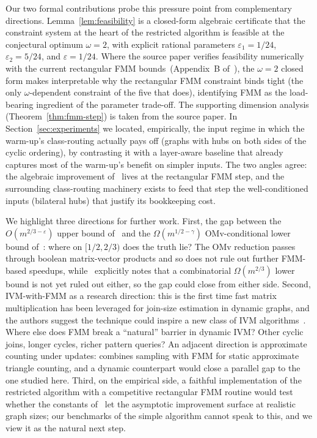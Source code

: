 \documentclass[sigconf,nonacm]{acmart}
\theoremstyle{plain}
\theoremstyle{definition}
\begin{document}
Our two formal contributions probe this pressure point from
complementary directions. Lemma~\ref{lem:feasibility} is a
closed-form algebraic certificate that the constraint system at
the heart of the restricted algorithm is feasible at the
conjectural optimum $\omega = 2$, with explicit rational
parameters $\varepsilon_1 = 1/24$, $\varepsilon_2 = 5/24$, and
$\varepsilon = 1/24$. Where the source paper verifies feasibility
numerically with the current rectangular FMM
bounds~(Appendix~B of~\cite{AssadiShah25}), the $\omega = 2$
closed form makes interpretable why the rectangular FMM constraint
binds tight (the only $\omega$-dependent constraint of the five
that does), identifying FMM as the load-bearing ingredient of the
parameter trade-off. The supporting dimension analysis
(Theorem~\ref{thm:fmm-step}) is taken from the source paper. In
Section~\ref{sec:experiments} we located, empirically, the input
regime in which the warm-up's class-routing actually pays off
(graphs with hubs on both sides of the cyclic ordering), by
contrasting it with a layer-aware baseline that already captures
most of the warm-up's benefit on simpler inputs. The two angles
agree: the algebraic improvement of~\cite{AssadiShah25} lives at
the rectangular FMM step, and the surrounding class-routing
machinery exists to feed that step the well-conditioned inputs
(bilateral hubs) that justify its bookkeeping cost.

We highlight three directions for further work. First, the gap between the
$O(m^{2/3-\varepsilon})$ upper bound of~\cite{AssadiShah25} and the
$\Omega(m^{1/2-\gamma})$ OMv-conditional lower bound
of~\cite{HKNS15}: where on $[1/2, 2/3)$ does the truth lie? The OMv
reduction passes through boolean matrix-vector products and so does
not rule out further FMM-based speedups, while~\cite{AssadiShah25}
explicitly notes that a combinatorial $\Omega(m^{2/3})$ lower bound is
not yet ruled out either, so the gap could close from either side.
Second, IVM-with-FMM as a research direction: this is the first time
fast matrix multiplication has been leveraged for join-size estimation
in dynamic graphs, and the authors suggest the technique could
inspire a new class of IVM algorithms~\cite{AssadiShah25}. Where
else does FMM break a ``natural'' barrier in dynamic IVM? Other
cyclic joins, longer cycles, richer pattern queries? An adjacent
direction is approximate counting under updates: \cite{Tetek22}
combines sampling with FMM for static approximate triangle
counting, and a dynamic counterpart would close a parallel gap to
the one studied here. Third, on the empirical side, a faithful
implementation of the restricted algorithm with a competitive
rectangular FMM routine would test whether the constants
of~\cite{ADW25} let the asymptotic improvement surface at realistic
graph sizes; our benchmarks of the simple algorithm cannot speak to
this, and we view it as the natural next step.



\end{document}
